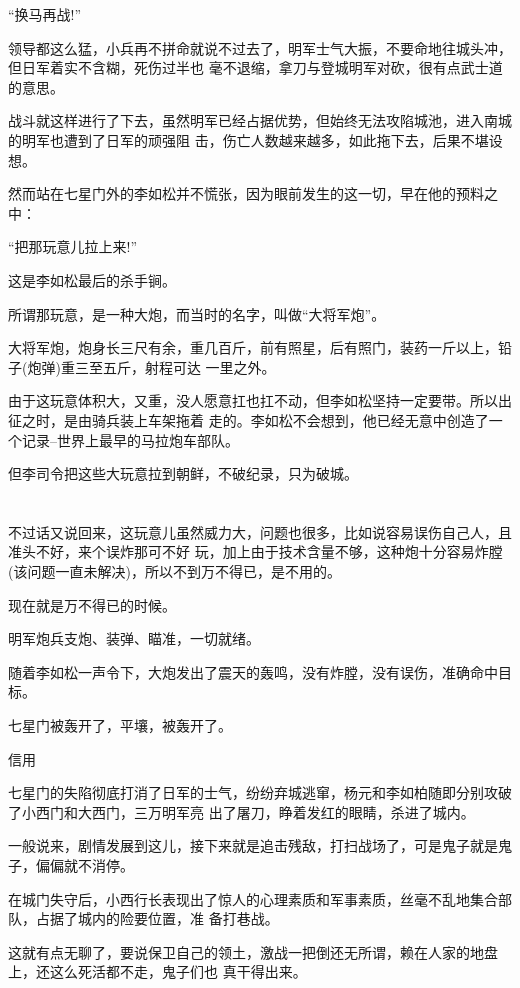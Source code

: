 \documentclass[11pt,a4paper,onecolumn]{article}
\begin{document}
``换马再战!''

领导都这么猛，小兵再不拼命就说不过去了，明军士气大振，不要命地往城头冲，但日军着实不含糊，死伤过半也
毫不退缩，拿刀与登城明军对砍，很有点武士道的意思。

战斗就这样进行了下去，虽然明军已经占据优势，但始终无法攻陷城池，进入南城的明军也遭到了日军的顽强阻
击，伤亡人数越来越多，如此拖下去，后果不堪设想。

然而站在七星门外的李如松并不慌张，因为眼前发生的这一切，早在他的预料之中：

``把那玩意儿拉上来!''

这是李如松最后的杀手锏。

所谓那玩意，是一种大炮，而当时的名字，叫做``大将军炮''。

大将军炮，炮身长三尺有余，重几百斤，前有照星，后有照门，装药一斤以上，铅子(炮弹)重三至五斤，射程可达
一里之外。

由于这玩意体积大，又重，没人愿意扛也扛不动，但李如松坚持一定要带。所以出征之时，是由骑兵装上车架拖着
走的。李如松不会想到，他已经无意中创造了一个记录--世界上最早的马拉炮车部队。

但李司令把这些大玩意拉到朝鲜，不破纪录，只为破城。

\section[\thesection]{}

不过话又说回来，这玩意儿虽然威力大，问题也很多，比如说容易误伤自己人，且准头不好，来个误炸那可不好
玩，加上由于技术含量不够，这种炮十分容易炸膛(该问题一直未解决)，所以不到万不得已，是不用的。

现在就是万不得已的时候。

明军炮兵支炮、装弹、瞄准，一切就绪。

随着李如松一声令下，大炮发出了震天的轰鸣，没有炸膛，没有误伤，准确命中目标。

七星门被轰开了，平壤，被轰开了。

信用

七星门的失陷彻底打消了日军的士气，纷纷弃城逃窜，杨元和李如柏随即分别攻破了小西门和大西门，三万明军亮
出了屠刀，睁着发红的眼睛，杀进了城内。

一般说来，剧情发展到这儿，接下来就是追击残敌，打扫战场了，可是鬼子就是鬼子，偏偏就不消停。

在城门失守后，小西行长表现出了惊人的心理素质和军事素质，丝毫不乱地集合部队，占据了城内的险要位置，准
备打巷战。

这就有点无聊了，要说保卫自己的领土，激战一把倒还无所谓，赖在人家的地盘上，还这么死活都不走，鬼子们也
真干得出来。
\end{document}
